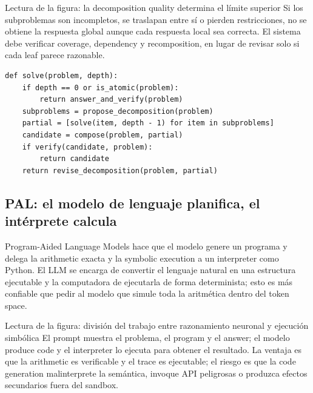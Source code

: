 \begin{knowledgebox}{Lectura de la figura: la decomposition quality determina el límite superior}
Si los subproblemas son incompletos, se traslapan entre sí o pierden restricciones, no se obtiene la respuesta global aunque cada respuesta local sea correcta. El sistema debe verificar coverage, dependency y recomposition, en lugar de revisar solo si cada leaf parece razonable.
\end{knowledgebox}

\begin{lstlisting}[caption={Flujo de razonamiento estructurado con verificación y retroceso}]
def solve(problem, depth):
    if depth == 0 or is_atomic(problem):
        return answer_and_verify(problem)
    subproblems = propose_decomposition(problem)
    partial = [solve(item, depth - 1) for item in subproblems]
    candidate = compose(problem, partial)
    if verify(candidate, problem):
        return candidate
    return revise_decomposition(problem, partial)
\end{lstlisting}

\subsection{PAL: el modelo de lenguaje planifica, el intérprete calcula}

Program-Aided Language Models hace que el modelo genere un programa y delega la arithmetic exacta y la symbolic execution a un interpreter como Python. El LLM se encarga de convertir el lenguaje natural en una estructura ejecutable y la computadora de ejecutarla de forma determinista; esto es más confiable que pedir al modelo que simule toda la aritmética dentro del token space.


\begin{knowledgebox}{Lectura de la figura: división del trabajo entre razonamiento neuronal y ejecución simbólica}
El prompt muestra el problema, el program y el answer; el modelo produce code y el interpreter lo ejecuta para obtener el resultado. La ventaja es que la arithmetic es verificable y el trace es ejecutable; el riesgo es que la code generation malinterprete la semántica, invoque API peligrosas o produzca efectos secundarios fuera del sandbox.
\end{knowledgebox}

